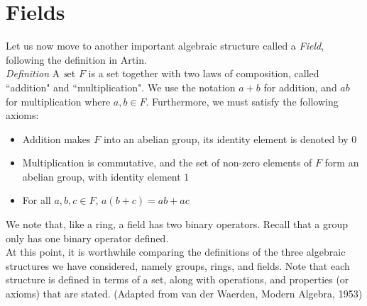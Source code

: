 

\section{Fields}

Let us now move to another important algebraic structure called a \textit{Field}, following the definition in Artin.\\

\textit{Definition} A \textit set $F$ is a set together with two laws of composition, called ``addition" and ``multiplication".  We use the notation $a+b$ for addition, and $ab$ for multiplication where $a,b \in F$.  Furthermore, we must satisfy the following axioms:\\

\begin{itemize}
\item Addition makes $F$ into an abelian group, its identity element is denoted by $0$
\item Multiplication is commutative, and the set of non-zero elements of $F$ form an abelian group, with identity element $1$
\item For all $a,b,c \in F$, $a\left(b+c\right)=ab+ac$
\end{itemize}

We note that, like a ring, a field has two binary operators.  Recall that a group only has one binary operator defined.\\

At this point, it is worthwhile comparing the definitions of the three algebraic structures we have considered, namely groups, rings, and fields.  Note that each structure is defined in terms of a set, along with operations, and properties (or axioms) that are stated.  (Adapted from van der Waerden, Modern Algebra, 1953)\\


